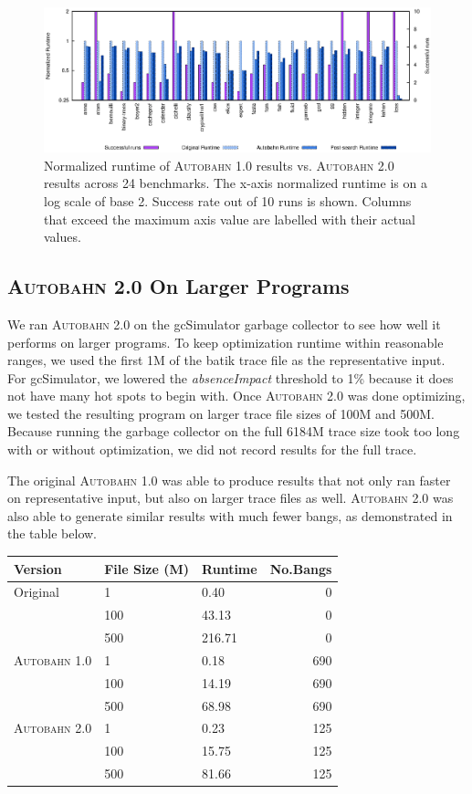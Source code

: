 \documentclass[format=sigplan, review=true]{acmart}
\newcommand{\hotspots}[0]{hot spots}
\newcommand{\Ao}[0]{\textsc{Autobahn 1.0}}
\newcommand{\At}[0]{\textsc{Autobahn 2.0}}
\newcommand{\absim}[0]{\textit{absenceImpact}}
\begin{document}
\begin{figure}
\includegraphics[width=\textwidth]{pap1}
\caption{Normalized runtime of \Ao{} results vs. \At{} results across 24 benchmarks. The x-axis normalized runtime is on a log scale of base 2. Success rate out of 10 runs is shown. Columns that exceed the maximum axis value are labelled with their actual values.}
\end{figure}

\subsection{\At{} On Larger Programs}

We ran \At{} on the gcSimulator garbage collector to see how well it performs on larger programs. To keep optimization runtime within reasonable ranges, we used the first 1M of the batik trace file as the representative input. For gcSimulator, we lowered the \absim{} threshold to 1\% because it does not have many \hotspots{} to begin with. Once \At{} was done optimizing, we tested the resulting program on larger trace file sizes of 100M and 500M. Because running the garbage collector on the full 6184M trace size took too long with or without optimization, we did not record results for the full trace. 

The original \Ao{} was able to produce results that not only ran faster on representative input, but also on larger trace files as well. \At{} was also able to generate similar results with much fewer bangs, as demonstrated in the table below. 

\begin{tabular}{lllr}
\hline
Version   & File Size (M) & Runtime & No.Bangs \\
\hline
Original      & 1   &   0.40	 & 0   \\
          & 100        & 43.13      & 0 \\
       & 500     &  216.71 & 0 \\
\Ao{}       & 1     & 0.18    &  690\\
          & 100        & 14.19 &  690\\
                 & 500        & 68.98	& 690\\
\At{}      & 1   &  0.23 & 125    \\
          & 100        & 15.75 & 125      \\
       & 500    & 81.66 & 125    \\

\hline
\end{tabular}
 
\end{document}
